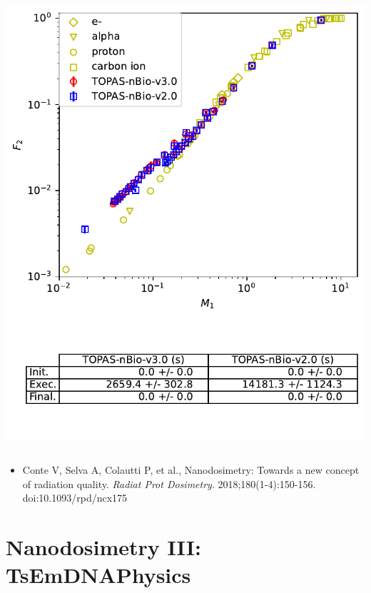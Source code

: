 \documentclass[aspectratio=1610]{beamer}
\begin{document}
\begin{frame}{\secname}
\begin{columns}
\begin{column}{0.4\linewidth}
     \includegraphics[width=\textwidth]{./NanodosimetryII/nanoII_opt6}
    \end{column}
   \end{columns}
\begin{itemize}
\item \tiny{Conte V, Selva A, Colautti P, et al., Nanodosimetry: Towards a new concept of radiation quality. \textit{Radiat Prot Dosimetry}. 2018;180(1-4):150-156. doi:10.1093/rpd/ncx175}
\end{itemize}
\end{frame}

\section{Nanodosimetry III: TsEmDNAPhysics}
\end{document}
